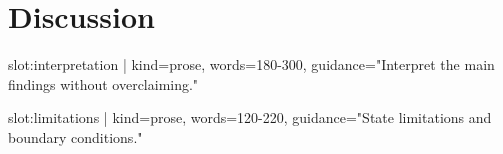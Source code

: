 \section{Discussion}

{{slot:interpretation | kind=prose, words=180-300, guidance="Interpret the main findings without overclaiming."}}

{{slot:limitations | kind=prose, words=120-220, guidance="State limitations and boundary conditions."}}
